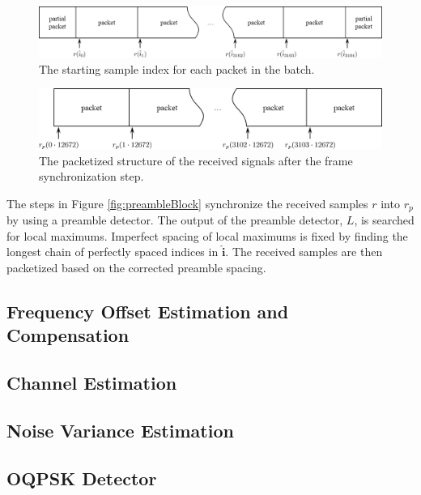 \begin{figure}
	\centering\includegraphics[width=\textwidth/10*8]{figures/gpu/packets_in_batch.png}
	\caption{The starting sample index for each packet in the batch.}
	\label{fig:packets_in_batch}
\end{figure}
\begin{figure}
	\centering\includegraphics[width=\textwidth/10*8]{figures/gpu/packetized.png}
	\caption{The packetized structure of the received signals after the frame synchronization step.}
	\label{fig:packetized}
\end{figure}

The steps in Figure \ref{fig:preambleBlock} synchronize the received samples $r$ into $r_p$ by using a preamble detector.
The output of the preamble detector, $L$, is searched for local maximums.
Imperfect spacing of local maximums is fixed by finding the longest chain of perfectly spaced indices in $\hat{\mathbf{i}}$.
The received samples are then packetized based on the corrected preamble spacing.

\clearpage


\subsection{Frequency Offset Estimation and Compensation}
\label{sec:frequency_offset_estimation_and_compensation}

\subsection{Channel Estimation}
\label{sec:channel_estimation}

\subsection{Noise Variance Estimation}
\label{sec:noise_variance_estimation}

\subsection{OQPSK Detector}
\label{sec:oqpsk_detector}


